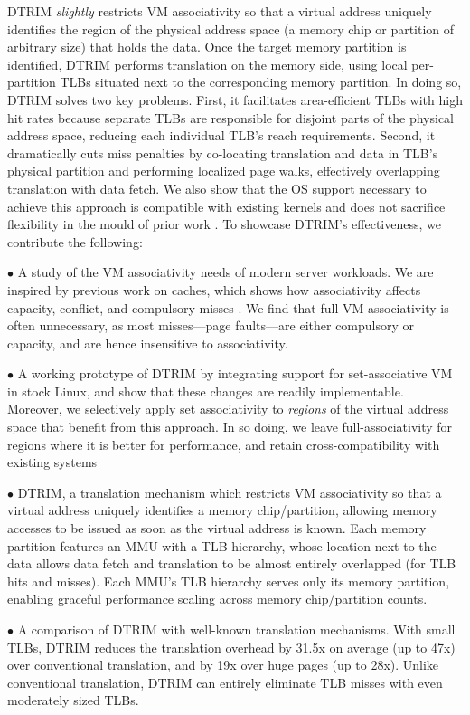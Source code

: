 DTRIM {\it slightly} restricts VM associativity so that a virtual
address uniquely identifies the region of the physical address space
(a memory chip or partition of arbitrary size) that holds the
data. Once the target memory partition is identified, DTRIM performs
translation on the memory side, using local per-partition TLBs situated
next to the corresponding memory partition. In doing so, DTRIM solves two
key problems. First, it facilitates area-efficient TLBs with high hit
rates because separate TLBs are responsible for disjoint parts of the
physical address space, reducing each individual TLB's reach
requirements. Second, it dramatically cuts miss penalties by
co-locating translation and data in TLB's physical partition and
performing localized page walks, effectively overlapping translation
with data fetch. We also show that the OS support necessary to achieve
this approach is compatible with existing kernels and does not
sacrifice flexibility in the mould of prior work \cite{basu:efficient,
  haria:devirtualizing}. To showcase DTRIM's effectiveness, we
contribute the following:

\noindent $\bullet$ A study of the VM associativity needs of modern
server workloads. We are inspired by previous work on caches, which
shows how associativity affects capacity, conflict, and compulsory
misses \cite{hill:case}. We find that full VM associativity is often
unnecessary, as most misses---page faults---are either compulsory or
capacity, and are hence insensitive to associativity. 

\noindent $\bullet$ A working prototype of DTRIM by integrating
support for set-associative VM in stock Linux, and show that these
changes are readily implementable. Moreover, we selectively apply set
associativity to {\it regions} of the virtual address space that
benefit from this approach. In so doing, we leave full-associativity
for regions where it is better for performance, and retain
cross-compatibility with existing systems

\noindent $\bullet$ DTRIM, a translation mechanism which restricts VM
associativity so that a virtual address uniquely identifies a memory
chip/partition, allowing memory accesses to be issued as soon as the
virtual address is known. Each memory partition features an MMU with a
TLB hierarchy, whose location next to the data allows data fetch and
translation to be almost entirely overlapped (for TLB hits and
misses). Each MMU's TLB hierarchy serves only its memory partition,
enabling graceful performance scaling across memory chip/partition
counts.

\noindent $\bullet$ A comparison of DTRIM with well-known translation
mechanisms. With small TLBs, DTRIM reduces the translation overhead 
by 31.5x on average (up to 47x) over conventional translation, and by 19x over huge 
pages (up to 28x). Unlike conventional translation, DTRIM can entirely eliminate TLB 
misses with even moderately sized TLBs.